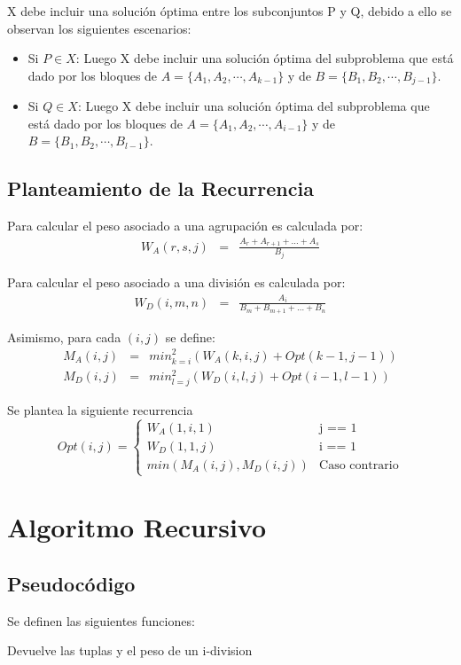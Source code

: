 \documentclass{article}
\begin{document}
X debe incluir una solución óptima entre los subconjuntos P y Q, debido a ello se observan los siguientes escenarios:

\begin{itemize}
\item Si $ P \in X $:  Luego X debe incluir una solución óptima del subproblema que está dado por los bloques de $A = \{ A_1, A_2,\cdots,A_{k-1} \}$ y de $B = \{B_1,B_2,\cdots,B_{j-1}\}$.
\item Si $ Q \in X $:  Luego X debe incluir una solución óptima del subproblema que está dado por los bloques de $A = \{ A_1, A_2,\cdots,A_{i-1} \}$ y de $B = \{B_1,B_2,\cdots,B_{l-1} \}$.
\end{itemize}

\subsection{Planteamiento de la Recurrencia}
Para calcular el peso asociado a una agrupación es calculada por:
\begin{eqnarray*}
W_A(r,s,j) & = & \frac{A_r+A_{r+1}+\dots+A_s}{B_j}
\end{eqnarray*}

Para calcular el peso asociado a una división es calculada por:
\begin{eqnarray*}
W_D(i,m,n) & = & \frac{A_i}{B_m+B_{m+1}+\dots+B_n}
\end{eqnarray*}

Asimismo, para cada $(i,j)$ se define:
\begin{eqnarray*}
M_A(i,j) & = & min_{k=i}^{2}\left( W_A(k,i,j) + Opt(k-1,j-1) \right) \\ 
M_D(i,j) & = & min_{l=j}^{2}\left( W_D(i,l,j) + Opt(i-1,l-1) \right)
\end{eqnarray*}

Se plantea la siguiente recurrencia
\begin{equation*}
Opt(i,j) =
\begin{cases}
W_A(1,i,1) & \text{j == 1}\\
W_D(1,1,j) & \text{i == 1}\\
min( M_A(i,j) , M_D(i,j) ) &  \text{Caso contrario}
\end{cases}
\end{equation*}

\section{Algoritmo Recursivo}
\subsection{Pseudocódigo}
Se definen las siguientes funciones:
\begin{algorithm}
\caption{Devuelve las tuplas y el peso de un i-division}
\begin{algorithmic}[1]
    \EndFor
\EndProcedure
\end{algorithmic}
\end{algorithm}
\end{document}
